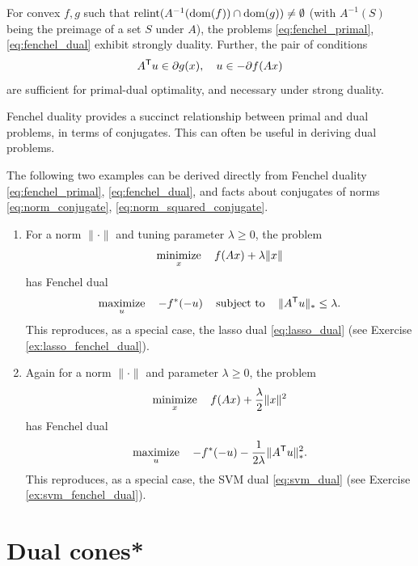 \begin{Corollary}
\label{cor:fenchel_dual}
For convex $f,g$ such that $\operatorname{relint}(A^{-1}(\operatorname{dom}(f)) \cap \operatorname{dom}(g)) \not=
\emptyset$ (with $A^{-1}(S)$ being the preimage of a set $S$ under $A$), the
problems \eqref{eq:fenchel_primal}, \eqref{eq:fenchel_dual} exhibit strongly 
duality. Further, the pair of conditions
\[
A^{\mathsf{T}} u \in \partial g(x), \quad u \in - \partial f(Ax)
\]
are sufficient for primal-dual optimality, and necessary under strong duality.   
\end{Corollary}

Fenchel duality provides a succinct relationship between primal and dual
problems, in terms of conjugates. This can often be useful in deriving dual
problems.

\begin{Example}
The following two examples can be derived directly from Fenchel duality
\eqref{eq:fenchel_primal}, \eqref{eq:fenchel_dual}, and facts about conjugates
of norms \eqref{eq:norm_conjugate}, \eqref{eq:norm_squared_conjugate}.

\begin{enumerate}[label=\alph*., ref=\alph*]
\item {}
For a norm $\|\cdot\|$ and tuning parameter $\lambda \geq 0$, the problem    
\[
\operatorname*{minimize}_x \quad f(Ax) + \lambda \|x\| 
\]
has Fenchel dual 
\[
\operatorname*{maximize}_u \quad -f^*(-u) \quad \operatorname{subject\,\,to} \quad \|A^{\mathsf{T}} u\|_* \leq \lambda.        
\]
This reproduces, as a special case, the lasso dual \eqref{eq:lasso_dual} (see
Exercise \ref{ex:lasso_fenchel_dual}). 

\item {}
Again for a norm $\|\cdot\|$ and parameter $\lambda \geq 0$, the problem   
\[
\operatorname*{minimize}_x \quad f(Ax) + \frac{\lambda}{2} \|x\|^2
\]
has Fenchel dual 
\[
\operatorname*{maximize}_u \quad -f^*(-u) - \frac{1}{2\lambda} \|A^{\mathsf{T}} u\|_*^2. 
\]
This reproduces, as a special case, the SVM dual \eqref{eq:svm_dual} (see
Exercise \ref{ex:svm_fenchel_dual}). 
\end{enumerate}
\end{Example}

\section{Dual cones*}
\label{sec:dual_cones}

